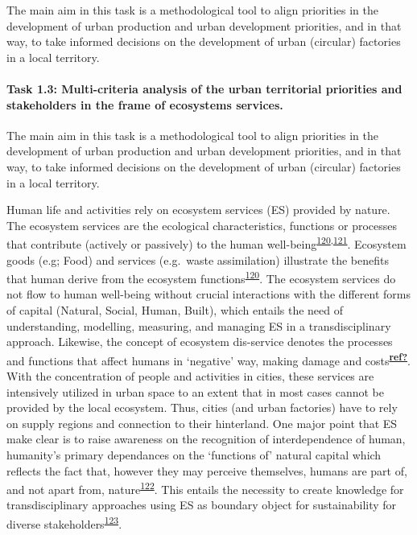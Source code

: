 \documentclass[
  12pt,
  a4paperpaper,
  onecolumn]{article}
\let\oldparagraph\paragraph
\renewcommand{\paragraph}[1]{\oldparagraph{#1}\mbox{}}
\let\paragraph\oldparagraph
\begin{document}
The main aim in this task is a methodological tool to align priorities
in the development of urban production and urban development priorities,
and in that way, to take informed decisions on the development of urban
(circular) factories in a local territory.

\hypertarget{task-1.3-multi-criteria-analysis-of-the-urban-territorial-priorities-and-stakeholders-in-the-frame-of-ecosystems-services.}{%
\paragraph{Task 1.3: Multi-criteria analysis of the urban territorial
priorities and stakeholders in the frame of ecosystems
services.}\label{task-1.3-multi-criteria-analysis-of-the-urban-territorial-priorities-and-stakeholders-in-the-frame-of-ecosystems-services.}}

The main aim in this task is a methodological tool to align priorities
in the development of urban production and urban development priorities,
and in that way, to take informed decisions on the development of urban
(circular) factories in a local territory.

Human life and activities rely on ecosystem services (ES) provided by
nature. The ecosystem services are the ecological characteristics,
functions or processes that contribute (actively or passively) to the
human
well-being\textsuperscript{\protect\hyperlink{ref-Costanza1997}{120},\protect\hyperlink{ref-Costanza2017}{121}}.
Ecosystem goods (e.g; Food) and services (e.g.~waste assimilation)
illustrate the benefits that human derive from the ecosystem
functions\textsuperscript{\protect\hyperlink{ref-Costanza1997}{120}}.
The ecosystem services do not flow to human well-being without crucial
interactions with the different forms of capital (Natural, Social,
Human, Built), which entails the need of understanding, modelling,
measuring, and managing ES in a transdisciplinary approach. Likewise,
the concept of ecosystem dis-service denotes the processes and functions
that affect humans in `negative' way, making damage and
costs\textsuperscript{\protect\hyperlink{ref-ref}{\textbf{ref?}}}. With
the concentration of people and activities in cities, these services are
intensively utilized in urban space to an extent that in most cases
cannot be provided by the local ecosystem. Thus, cities (and urban
factories) have to rely on supply regions and connection to their
hinterland. One major point that ES make clear is to raise awareness on
the recognition of interdependence of human, humanity's primary
dependances on the `functions of' natural capital which reflects the
fact that, however they may perceive themselves, humans are part of, and
not apart from,
nature\textsuperscript{\protect\hyperlink{ref-Ekins2003}{122}}. This
entails the necessity to create knowledge for transdisciplinary
approaches using ES as boundary object for sustainability for diverse
stakeholders\textsuperscript{\protect\hyperlink{ref-Honeck2021}{123}}.
\end{document}
